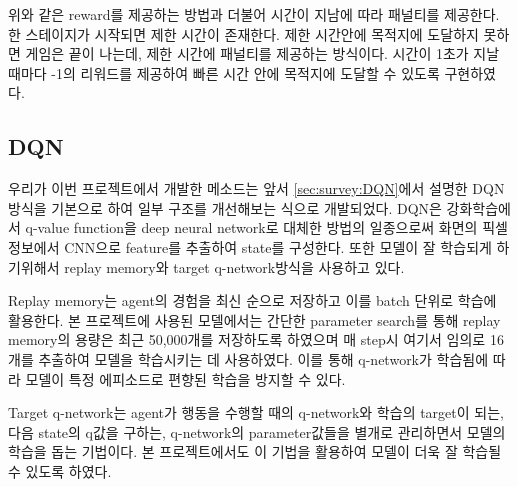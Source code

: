위와 같은 reward를 제공하는 방법과 더불어 시간이 지남에 따라 패널티를 제공한다. 
한 스테이지가 시작되면 제한 시간이 존재한다. 
제한 시간안에 목적지에 도달하지 못하면 게임은 끝이 나는데, 제한 시간에 패널티를 제공하는 방식이다. 
시간이 1초가 지날 때마다 -1의 리워드를 제공하여 빠른 시간 안에 목적지에 도달할 수 있도록 구현하였다. 

\subsection{DQN}
\label{sec:method:dqn}
우리가 이번 프로젝트에서 개발한 메소드는 앞서 \ref{sec:survey:DQN}에서 설명한 DQN방식을 기본으로 하여 일부 구조를 개선해보는 식으로 개발되었다.
DQN은 강화학습에서 q-value function을 deep neural network로 대체한 방법의 일종으로써 화면의 픽셀 정보에서 CNN으로 feature를 추출하여 state를 구성한다.
또한 모델이 잘 학습되게 하기위해서 replay memory와 target q-network방식을 사용하고 있다.

Replay memory는 agent의 경험을 최신 순으로 저장하고 이를 batch 단위로 학습에 활용한다.
본 프로젝트에 사용된 모델에서는 간단한 parameter search를 통해 replay memory의 용량은 최근 50,000개를 저장하도록 하였으며 매 step시 여기서 임의로 16개를 추출하여 모델을 학습시키는 데 사용하였다.
이를 통해 q-network가 학습됨에 따라 모델이 특정 에피소드로 편향된 학습을 방지할 수 있다.

Target q-network는 agent가 행동을 수행할 때의 q-network와 학습의 target이 되는, 다음 state의 q값을 구하는, q-network의 parameter값들을 별개로 관리하면서 모델의 학습을 돕는 기법이다.
본 프로젝트에서도 이 기법을 활용하여 모델이 더욱 잘 학습될 수 있도록 하였다.

